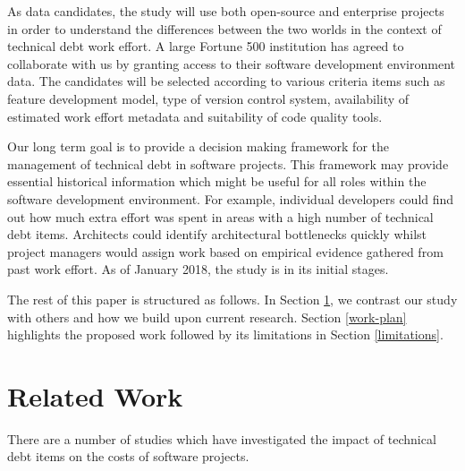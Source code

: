 As data candidates, the study will use both open-source and enterprise projects
in order to understand the differences between the two worlds in the context of
technical debt work effort. A large Fortune 500 institution has agreed to
collaborate with us by granting access to their software development environment
data. The candidates will be selected according to various criteria items such
as feature development model, type of version control system, availability of
estimated work effort metadata and suitability of code quality tools. 

Our long term goal is to provide a decision making framework for the management of
technical debt in software projects. This framework may provide essential
historical information which might be useful for all roles within the software
development environment. For example, individual developers could find out how
much extra effort was spent in areas with a high number of technical debt items.
Architects could identify architectural bottlenecks quickly whilst project
managers would assign work based on empirical evidence gathered from past work
effort. As of January 2018, the study is in its initial stages.

The rest of this paper is structured as follows.
In Section \ref{related-work}, we contrast our study with others and how we
build upon current research. Section \ref{work-plan} highlights the proposed
work followed by its limitations in Section \ref{limitations}.  

\section{Related Work}
\label{related-work}

There are a number of studies which have investigated the impact of technical
debt items on the costs of software projects. 

